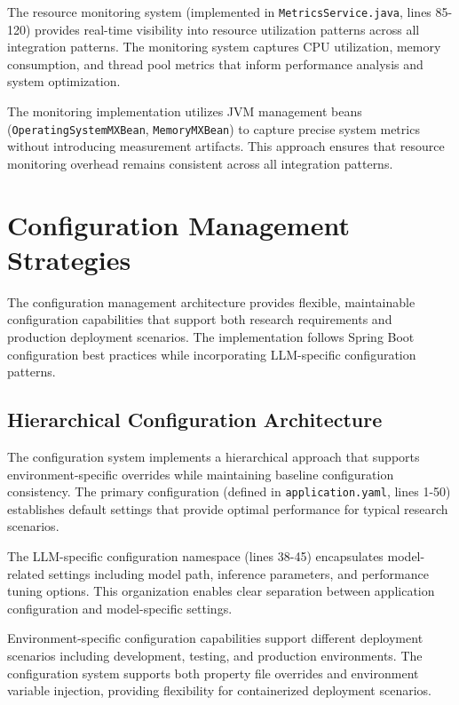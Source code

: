 The resource monitoring system (implemented in \texttt{MetricsService.java}, lines 85-120) provides real-time visibility into resource utilization patterns across all integration patterns. The monitoring system captures CPU utilization, memory consumption, and thread pool metrics that inform performance analysis and system optimization.


The monitoring implementation utilizes JVM management beans (\texttt{OperatingSystemMXBean}, \texttt{MemoryMXBean}) to capture precise system metrics without introducing measurement artifacts. This approach ensures that resource monitoring overhead remains consistent across all integration patterns.


\section{Configuration Management Strategies}

The configuration management architecture provides flexible, maintainable configuration capabilities that support both research requirements and production deployment scenarios. The implementation follows Spring Boot configuration best practices while incorporating LLM-specific configuration patterns.

\subsection{Hierarchical Configuration Architecture}

The configuration system implements a hierarchical approach that supports environment-specific overrides while maintaining baseline configuration consistency. The primary configuration (defined in \texttt{application.yaml}, lines 1-50) establishes default settings that provide optimal performance for typical research scenarios.


The LLM-specific configuration namespace (lines 38-45) encapsulates model-related settings including model path, inference parameters, and performance tuning options. This organization enables clear separation between application configuration and model-specific settings.

Environment-specific configuration capabilities support different deployment scenarios including development, testing, and production environments. The configuration system supports both property file overrides and environment variable injection, providing flexibility for containerized deployment scenarios.

